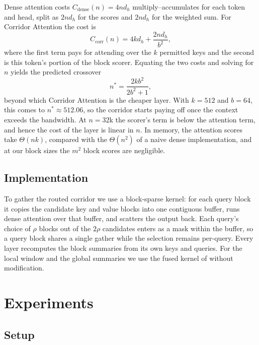 \documentclass[11pt]{article}
\begin{document}
Dense attention costs $C_{\mathrm{dense}}(n) = 4 n d_h$ multiply--accumulates
for each token and head, split as $2 n d_h$ for the scores and $2 n d_h$ for
the weighted sum. For Corridor Attention the cost is
\begin{equation}\label{eq:cost}
  C_{\mathrm{corr}}(n) = 4 k d_h + \frac{2 n d_h}{b^{2}} ,
\end{equation}
where the first term pays for attending over the $k$ permitted keys and the
second is this token's portion of the block scorer. Equating the two costs
and solving for $n$ yields the predicted crossover
\begin{equation}\label{eq:crossover}
  n^{*} = \frac{2 k b^{2}}{2 b^{2} + 1} ,
\end{equation}
beyond which Corridor Attention is the cheaper layer. With $k = 512$ and
$b = 64$, this comes to $n^{*} \approx 512.06$, so the corridor starts paying
off once the context exceeds the bandwidth. At $n = 32$k the scorer's term is
below the attention term, and hence the cost of the layer is linear in $n$.
In memory, the attention scores take $\Theta(nk)$, compared with the
$\Theta(n^2)$ of a naive dense implementation, and at our block sizes the
$m^2$ block scores are negligible.

\subsection{Implementation}\label{sec:impl}

To gather the routed corridor we use a block-sparse kernel: for each query
block it copies the candidate key and value blocks into one contiguous
buffer, runs dense attention over that buffer, and scatters the output back.
Each query's choice of $\rho$ blocks out of the $2\rho$ candidates enters as
a mask within the buffer, so a query block shares a single gather while the
selection remains per-query. Every layer recomputes the block summaries from
its own keys and queries. For the local window and the global summaries we
use the fused kernel of \citet{dao2022flashattention} without modification.

\section{Experiments}\label{sec:experiments}

\subsection{Setup}\label{sec:setup}
\end{document}
